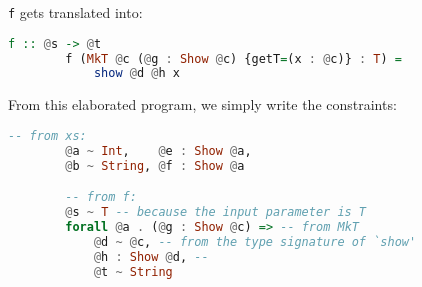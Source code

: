 \begin{ex}[Existentials]
    \lstinline{f} gets translated into:

    \begin{lstlisting}[language=Haskell]
        f :: @s -> @t
        f (MkT @c (@g : Show @c) {getT=(x : @c)} : T) = 
            show @d @h x
    \end{lstlisting}

    From this elaborated program, we simply write the constraints:
    
    \begin{lstlisting}[language=Haskell]
        -- from xs:
        @a ~ Int,    @e : Show @a,
        @b ~ String, @f : Show @a

        -- from f:
        @s ~ T -- because the input parameter is T
        forall @a . (@g : Show @c) => -- from MkT
            @d ~ @c, -- from the type signature of `show'
            @h : Show @d, -- 
            @t ~ String
    \end{lstlisting}
\end{ex}

